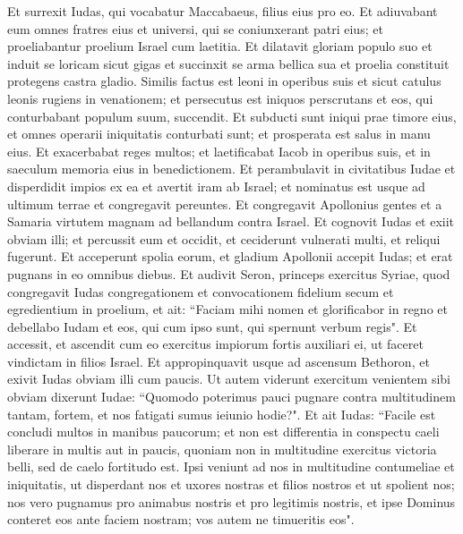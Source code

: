 \begin{biblechapter}  
\verse Et surrexit Iudas, qui vocabatur Maccabaeus, filius eius pro eo. 
\verse Et adiuvabant eum omnes fratres eius et universi, qui se coniunxerant patri eius; et proeliabantur proelium Israel cum laetitia. 
\verse Et dilatavit gloriam populo suo et induit se loricam sicut gigas et succinxit se arma bellica sua et proelia constituit protegens castra gladio. 
\verse Similis factus est leoni in operibus suis et sicut catulus leonis rugiens in venationem; 
\verse et persecutus est iniquos perscrutans et eos, qui conturbabant populum suum, succendit. 
\verse Et subducti sunt iniqui prae timore eius, et omnes operarii iniquitatis conturbati sunt; et prosperata est salus in manu eius. 
\verse Et exacerbabat reges multos; et laetificabat Iacob in operibus suis, et in saeculum memoria eius in benedictionem. 
\verse Et perambulavit in civitatibus Iudae et disperdidit impios ex ea et avertit iram ab Israel; 
\verse et nominatus est usque ad ultimum terrae et congregavit pereuntes. 
\verse Et congregavit Apollonius gentes et a Samaria virtutem magnam ad bellandum contra Israel. 
\verse Et cognovit Iudas et exiit obviam illi; et percussit eum et occidit, et ceciderunt vulnerati multi, et reliqui fugerunt. 
\verse Et acceperunt spolia eorum, et gladium Apollonii accepit Iudas; et erat pugnans in eo omnibus diebus. 
\verse Et audivit Seron, princeps exercitus Syriae, quod congregavit Iudas congregationem et convocationem fidelium secum et egredientium in proelium, 
\verse et ait: “Faciam mihi nomen et glorificabor in regno et debellabo Iudam et eos, qui cum ipso sunt, qui spernunt verbum regis". 
\verse Et accessit, et ascendit cum eo exercitus impiorum fortis auxiliari ei, ut faceret vindictam in filios Israel. 
\verse Et appropinquavit usque ad ascensum Bethoron, et exivit Iudas obviam illi cum paucis. 
\verse Ut autem viderunt exercitum venientem sibi obviam dixerunt Iudae: “Quomodo poterimus pauci pugnare contra multitudinem tantam, fortem, et nos fatigati sumus ieiunio hodie?". 
\verse Et ait Iudas: “Facile est concludi multos in manibus paucorum; et non est differentia in conspectu caeli liberare in multis aut in paucis, 
\verse quoniam non in multitudine exercitus victoria belli, sed de caelo fortitudo est.  
\verse Ipsi veniunt ad nos in multitudine contumeliae et iniquitatis, ut disperdant nos et uxores nostras et filios nostros et ut spolient nos; 
\verse nos vero pugnamus pro animabus nostris et pro legitimis nostris, 
\verse et ipse Dominus conteret eos ante faciem nostram; vos autem ne timueritis eos". 

\end{biblechapter}
